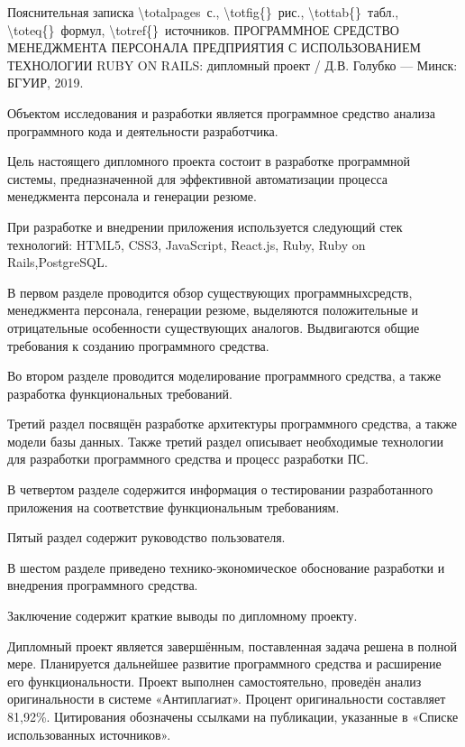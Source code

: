 \thispagestyle{empty}


\begin{center}
	Пояснительная записка \num{\totalpages}~с., \num{\totfig{}}~рис., \num{\tottab{}}~табл., \num{\toteq{}}~формул, \num{\totref{}}~источников.
	\MakeUppercase{Программное средство менеджмента персонала предприятия с использованием технологии Ruby on Rails}: 
	дипломный проект / Д.В. Голубко --- Минск: БГУИР, 2019.
\end{center}

Объектом исследования и разработки является программное средство анализа программного кода и деятельности разработчика.

Цель настоящего дипломного проекта состоит в разработке программной системы, предназначенной для эффективной
автоматизации процесса менеджмента персонала и генерации резюме. 

При разработке и внедрении приложения используется следующий стек технологий: HTML5, CSS3, JavaScript, React.js,
Ruby, Ruby on Rails,\linebreak PostgreSQL.

В первом разделе проводится обзор существующих программных\linebreak средств, менеджмента персонала, генерации резюме,
выделяются положительные и отрицательные особенности существующих аналогов.
Выдвигаются общие требования к созданию программного средства.

Во втором разделе проводится моделирование программного средства, а также разработка функциональных требований.

Третий раздел посвящён разработке архитектуры программного средства, а также модели базы данных.
Также третий раздел описывает необходимые технологии для разработки программного средства и процесс разработки ПС.

В четвертом разделе содержится информация о тестировании разработанного приложения на соответствие функциональным требованиям.

Пятый раздел содержит руководство пользователя.

В шестом разделе приведено технико-экономическое обоснование разработки и внедрения программного средства.

Заключение содержит краткие выводы по дипломному проекту.

Дипломный проект является завершённым, поставленная задача решена в полной мере. Планируется дальнейшее развитие
программного средства и расширение его функциональности. Проект выполнен самостоятельно, проведён анализ оригинальности
в системе «Антиплагиат». Процент оригинальности составляет 81,92\%. Цитирования обозначены ссылками на публикации,
указанные в «Списке использованных источников».
